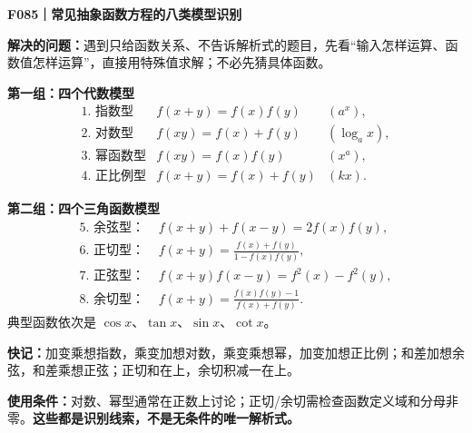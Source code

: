 \textbf{F085｜常见抽象函数方程的八类模型识别}

\textbf{解决的问题：}遇到只给函数关系、不告诉解析式的题目，先看“输入怎样运算、函数值怎样运算”，直接用特殊值求解；不必先猜具体函数。

\textbf{第一组：四个代数模型}
\[
\begin{array}{rll}
\text{1. 指数型}&f(x+y)=f(x)f(y)&(a^x),\\[3pt]
\text{2. 对数型}&f(xy)=f(x)+f(y)&(\log_a x),\\[3pt]
\text{3. 幂函数型}&f(xy)=f(x)f(y)&(x^a),\\[3pt]
\text{4. 正比例型}&f(x+y)=f(x)+f(y)&(kx).
\end{array}
\]

\textbf{第二组：四个三角函数模型}
\[
\begin{aligned}
\text{5. 余弦型： }&f(x+y)+f(x-y)=2f(x)f(y),\\[3pt]
\text{6. 正切型： }&f(x+y)=\frac{f(x)+f(y)}{1-f(x)f(y)},\\[5pt]
\text{7. 正弦型： }&f(x+y)f(x-y)=f^2(x)-f^2(y),\\[3pt]
\text{8. 余切型： }&f(x+y)=\frac{f(x)f(y)-1}{f(x)+f(y)}.
\end{aligned}
\]
典型函数依次是 $\cos x$、$\tan x$、$\sin x$、$\cot x$。

\textbf{快记：}加变乘想指数，乘变加想对数，乘变乘想幂，加变加想正比例；和差加想余弦，和差乘想正弦；正切和在上，余切积减一在上。

\textbf{使用条件：}对数、幂型通常在正数上讨论；正切/余切需检查函数定义域和分母非零。\textbf{这些都是识别线索，不是无条件的唯一解析式。}
